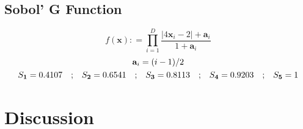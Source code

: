 \documentclass[preprint,12pt]{elsarticle}
\newcommand*{\M}[1]{\ensuremath{#1}\xspace}
\newcommand*{\vr}[1]{\M{\mathbf{#1}}}
\newcommand*{\deq}{\M{\mathrel{\mathop:}=}}
\newcommand{\T}[1]{\text{#1}}
\newcommand*{\QT}[2][]{\M{\quad\T{#2}\ifthenelse{\equal{#1}{}}{\quad}{#1}}}
\newcommand*{\modulus}[1]{\M{\left\lvert#1\right\rvert}}
\begin{document}
            


        \subsection{Sobol' G Function} \label{sub:Results:SobolG}
            \begin{equation} \label{def:SobolG}
                f(\vr{x}) \deq \prod_{i=1}^{D}{\frac{\modulus{4\vr{x}_i - 2} + \vr{a}_{i}}{1+\vr{a}_{i}}}
            \end{equation}
            \begin{gather*}
                \vr{a}_{i} = (i-1)/2 \\
                S_{\vr{1}} = 0.4107 \QT{;}S_{\vr{2}} = 0.6541 \QT{;} S_{\vr{3}} = 0.8113 \QT{;} S_{\vr{4}} = 0.9203 \QT{;} S_{\vr{5}} = 1
            \end{gather*}

            



     \section{Discussion} \label{sec:Discussion}







         
    
\end{document}
